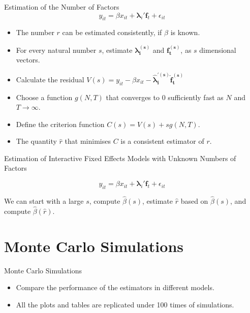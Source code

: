 \documentclass{beamer}
\begin{document}
\begin{frame}{Estimation of the Number of Factors}
    \[
    y_{it}=\beta x_{it}+\boldsymbol\lambda_i' \boldsymbol f_t+\epsilon_{it}
    \]
    \begin{itemize}
        \item The number $r$ can be estimated consistently, if $\beta$ is known.
        \item For every natural number $s$, estimate $\boldsymbol {\lambda_i^{(s)}}$ and $\boldsymbol{f_t^{(s)}}$, as $s$ dimensional vectors.
        \item Calculate the residual $V(s)=y_{it}-\beta x_{it}-\boldsymbol{\hat \lambda_i^{'(s)}}\boldsymbol{\hat f_t^{(s)}}$
        \item Choose a function $g(N,T)$ that converges to 0 sufficiently fast as $N$ and $T \to \infty$.
        \item Define the criterion function $C(s)=V(s)+sg(N,T)$.
        \item The quantity $\hat r$ that minimises $C$ is a consistent estimator of $r$.
    \end{itemize}
\end{frame}


\begin{frame}{Estimation of Interactive Fixed Effects Models with Unknown Numbers of Factors}

\[
    y_{it}=\beta x_{it}+\boldsymbol\lambda_i' \boldsymbol f_t+\epsilon_{it}
\]

We can start with a large $s$, compute $\hat \beta(s)$, estimate $\hat r$ based on $\hat \beta(s)$, and compute $\hat \beta(\hat r)$.

\end{frame}






\section{Monte Carlo Simulations}
\begin{frame}{Monte Carlo Simulations}

\begin{itemize}
    \item Compare the performance of the estimators in different models.

    \item All the plots and tables are replicated under 100 times of simulations.

\end{itemize}

\end{frame}
\end{document}
